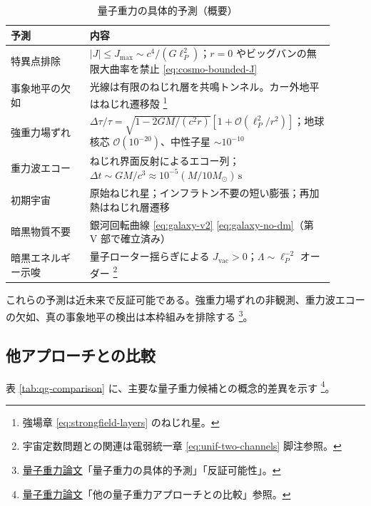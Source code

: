 \documentclass[dvipdfmx,a4paper,oneside]{jsbook}
\numberwithin{equation}{chapter}
\begin{document}
\begin{table}[htbp]
  \centering
  \caption{量子重力の具体的予測（概要）}
  \label{tab:qg-predictions}
  \begin{tabular}{@{}p{0.22\linewidth}p{0.68\linewidth}@{}}
    \toprule
    予測 & 内容 \\
    \midrule
    特異点排除 &
    \(|J| \leq J_{\max} \sim c^4/(G\ell_P^2)\)；\(r=0\) やビッグバンの無限大曲率を禁止 \eqref{eq:cosmo-bounded-J} \\
    事象地平の欠如 &
    光線は有限のねじれ層を共鳴トンネル。カー外地平はねじれ遷移殻 \footnote{強場章 \eqref{eq:strongfield-layers} のねじれ星。} \\
    強重力場ずれ &
    \(\Delta\tau/\tau = \sqrt{1 - 2GM/(c^2 r)}[1 + \mathcal{O}(\ell_P^2/r^2)]\)；地球核芯 \(\mathcal{O}(10^{-20})\)、中性子星 \(\sim 10^{-10}\) \\
    重力波エコー &
    ねじれ界面反射によるエコー列；\(\Delta t \sim GM/c^3 \approx 10^{-5}(M/10M_\odot)\,\mathrm{s}\) \\
    初期宇宙 &
    原始ねじれ星；インフラトン不要の短い膨張；再加熱はねじれ層遷移 \\
    暗黒物質不要 &
    銀河回転曲線 \eqref{eq:galaxy-v2} \eqref{eq:galaxy-no-dm}（第 V 部で確立済み） \\
    暗黒エネルギー示唆 &
    量子ローター揺らぎによる \(J_{\mathrm{vac}} > 0\)；\(\Lambda \sim \ell_P^{-2}\) オーダー \footnote{宇宙定数問題との関連は電弱統一章 \eqref{eq:unif-two-channels} 脚注参照。} \\
    \bottomrule
  \end{tabular}
\end{table}

これらの予測は近未来で反証可能である。強重力場ずれの非観測、重力波エコーの欠如、真の事象地平の検出は本枠組みを排除する \footnote{\hyperref[sec:sister-manuscripts]{量子重力論文}「量子重力の具体的予測」「反証可能性」。}。

\subsection{他アプローチとの比較}

表 \ref{tab:qg-comparison} に、主要な量子重力候補との概念的差異を示す \footnote{\hyperref[sec:sister-manuscripts]{量子重力論文}「他の量子重力アプローチとの比較」参照。}。
\end{document}
